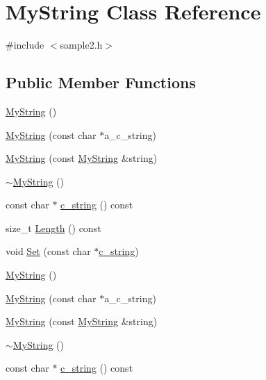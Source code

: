 \hypertarget{class_my_string}{}\section{My\+String Class Reference}
\label{class_my_string}


{\ttfamily \#include $<$sample2.\+h$>$}

\subsection*{Public Member Functions}
\begin{DoxyCompactItemize}
\item 
\mbox{\hyperlink{class_my_string_a1cb17852b83614394b59720779c5f918}{My\+String}} ()
\item 
\mbox{\hyperlink{class_my_string_a28134eb91b6698f46b12accefa157d0f}{My\+String}} (const char $\ast$a\+\_\+c\+\_\+string)
\item 
\mbox{\hyperlink{class_my_string_ae24c7cf89a58dd2287303df2ac054c66}{My\+String}} (const \mbox{\hyperlink{class_my_string}{My\+String}} \&string)
\item 
\mbox{\hyperlink{class_my_string_a7bee4fe8ad82a0b7b8f65b02054b156b}{$\sim$\+My\+String}} ()
\item 
const char $\ast$ \mbox{\hyperlink{class_my_string_aff2af0cf30db39fe24a235670ee6ff25}{c\+\_\+string}} () const
\item 
size\+\_\+t \mbox{\hyperlink{class_my_string_a4eb168b1ec401a732b3859abe004d648}{Length}} () const
\item 
void \mbox{\hyperlink{class_my_string_a521c4cd7eccac6ce554d8a51505e4970}{Set}} (const char $\ast$\mbox{\hyperlink{class_my_string_aff2af0cf30db39fe24a235670ee6ff25}{c\+\_\+string}})
\item 
\mbox{\hyperlink{class_my_string_a1cb17852b83614394b59720779c5f918}{My\+String}} ()
\item 
\mbox{\hyperlink{class_my_string_a28134eb91b6698f46b12accefa157d0f}{My\+String}} (const char $\ast$a\+\_\+c\+\_\+string)
\item 
\mbox{\hyperlink{class_my_string_ae24c7cf89a58dd2287303df2ac054c66}{My\+String}} (const \mbox{\hyperlink{class_my_string}{My\+String}} \&string)
\item 
\mbox{\hyperlink{class_my_string_a7bee4fe8ad82a0b7b8f65b02054b156b}{$\sim$\+My\+String}} ()
\item 
const char $\ast$ \mbox{\hyperlink{class_my_string_aff2af0cf30db39fe24a235670ee6ff25}{c\+\_\+string}} () const

\end{DoxyCompactItemize}
